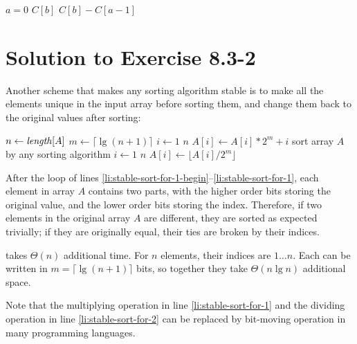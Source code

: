 \documentclass[a4paper, fleqn]{article}
\begin{document}
\begin{codebox}
\li \If $a = 0$
\li     \Then \Return $C[b]$
\li     \Else \Return $C[b] - C[a - 1]$
        \End
\end{codebox}







\section*{Solution to Exercise 8.3-2}

Another scheme that makes any sorting algorithm stable is to make all the 
elements unique in the input array before sorting them, and change them back to 
the original values after sorting:
\begin{codebox}
\li $n \gets \id{length}[A]$
\li $m \gets \lceil \lg(n + 1) \rceil$
\li \For $i \gets 1$ \To $n$                           \label{li:stable-sort-for-1-begin}
\li     \Do
            $A[i] \gets A[i] * 2^m + i$                \label{li:stable-sort-for-1}
        \End
\li sort array $A$ by any sorting algorithm
\li \For $i \gets 1$ \To $n$
\li     \Do
            $A[i] \gets \lfloor A[i] / 2^m \rfloor$    \label{li:stable-sort-for-2}
        \End
\end{codebox}
After the  loop of lines \ref{li:stable-sort-for-1-begin}--\ref{li:stable-sort-for-1}, 
each element in array $A$ contains two parts, with the higher order bits storing 
the original value, and the lower order bits storing the index. Therefore, if 
two elements in the original array $A$ are different, they are sorted as expected 
trivially; if they are originally equal, their ties are broken by their indices.

 takes $\Theta(n)$ additional time. For $n$ elements, their 
indices are $1 \ldots n$. Each can be written in $m = \lceil \lg(n + 1) \rceil$ 
bits, so together they take $\Theta(n \lg n)$ additional space.

Note that the multiplying operation in line \ref{li:stable-sort-for-1} and the 
dividing operation in line \ref{li:stable-sort-for-2} can be replaced by 
bit-moving operation in many programming languages.
\end{document}
